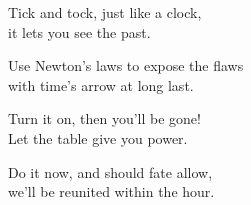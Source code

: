 \documentclass[parskip=half]{scrarticle}
\begin{document}
\huge
Tick and tock, just like a clock,\\
it lets you see the past.

Use Newton's laws to expose the flaws\\
with time's arrow at long last.

\bigskip

Turn it on, then you'll be gone!\\
Let the table give you power.

Do it now, and should fate allow,\\
we'll be reunited within the hour.
\end{document}
